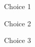 \noindent\begin{multichoice}[label=\textbf{\Roman*)}]
\item Choice 1
\item Choice 2
\item Choice 3
\end{multichoice}
